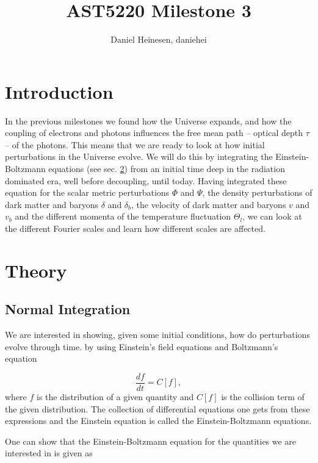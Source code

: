 \documentclass[a4paper,norsk, 10pt]{article}
\title{AST5220 Milestone 3}
\author{Daniel Heinesen, daniehei}
\begin{document}
\maketitle

\section{Introduction}
In the previous milestones we found how the Universe expands, and how the coupling of electrons and photons influences the free mean path -- optical depth $\tau$ -- of the photons. This means that we are ready to look at how initial perturbations in the Universe evolve. We will do this by integrating the Einstein-Boltzmann equations (see sec. \ref{sec:theory}) from an initial time deep in the radiation dominated era, well before decoupling, until today. Having integrated these equation for the scalar metric perturbations $\Phi$ and $\Psi$, the density perturbations of dark matter and baryons $\delta$ and $\delta_b$, the velocity of dark matter and baryons $v$ and $v_b$ and the different momenta of the temperature fluctuation $\Theta_l$, we can look at the different Fourier scales and learn how different scales are affected.

\section{Theory}\label{sec:theory}

\subsection{Normal Integration}\label{sec:normal}
We are interested in showing, given some initial conditions, how do perturbations evolve through time. by using Einstein's field equations and Boltzmann's equation

\begin{equation}
\frac{df}{dt} = C[f],
\end{equation}
where $f$ is the distribution of a given quantity and $C[f]$ is the collision term of the given distribution. The collection of differential equations one gets from these expressions and the Einstein equation is called the Einstein-Boltzmann equations.

One can show that the Einstein-Boltzmann equation for the quantities we are interested in is given as
\end{document}
